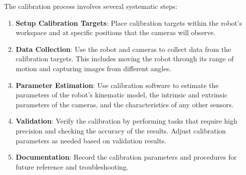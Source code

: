 The calibration process involves several systematic steps:

\begin{enumerate}
    \item \textbf{Setup Calibration Targets}: Place calibration targets within the robot’s workspace and at specific positions that the cameras will observe.
    \item \textbf{Data Collection}: Use the robot and cameras to collect data from the calibration targets. This includes moving the robot through its range of motion and capturing images from different angles.
    \item \textbf{Parameter Estimation}: Use calibration software to estimate the parameters of the robot’s kinematic model, the intrinsic and extrinsic parameters of the cameras, and the characteristics of any other sensors.
    \item \textbf{Validation}: Verify the calibration by performing tasks that require high precision and checking the accuracy of the results. Adjust calibration parameters as needed based on validation results.
    \item \textbf{Documentation}: Record the calibration parameters and procedures for future reference and troubleshooting.
\end{enumerate}



